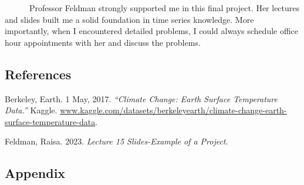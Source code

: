 \documentclass[
]{article}
\newlength{\cslhangindent}
\newlength{\cslentryspacingunit} %
\newenvironment{CSLReferences}[2] %
 {%
  \setlength{\parindent}{0pt}
  \ifodd #1
  \let\oldpar\par
  \def\par{\hangindent=\cslhangindent\oldpar}
  \fi
  \setlength{\parskip}{#2\cslentryspacingunit}
 }%
 {}
\begin{document}
~~~~~~Professor Feldman strongly supported me in this final project. Her
lectures and slides built me a solid foundation in time series
knowledge. More importantly, when I encountered detailed problems, I
could always schedule office hour appointments with her and discuss the
problems.

\hypertarget{references}{%
\subsection{References}\label{references}}

\hypertarget{refs}{}
\begin{CSLReferences}{1}{0}
\leavevmode{}%
Berkeley, Earth. 1 May, 2017. \emph{{``Climate Change: Earth Surface
Temperature Data.''}} Kaggle.
\href{https://www.kaggle.com/datasets/berkeleyearth/climate-change-earth-surface-temperature-data}{www.kaggle.com/datasets/berkeleyearth/climate-change-earth-surface-temperature-data}.

\leavevmode{}%
Feldman, Raisa. 2023. \emph{Lecture 15 Slides-Example of a Project}.

\end{CSLReferences}

\hypertarget{appendix}{%
\subsection{Appendix}\label{appendix}}
\end{document}
